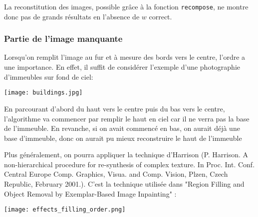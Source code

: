 \documentclass[a4paper, 10pt]{article}
\begin{document}
La reconstitution des images, possible grâce à la fonction \texttt{recompose}, ne montre donc pas de grands résultats en l'absence de $w$ correct.

\subsubsection*{Partie de l'image manquante}

Lorsqu'on remplit l'image au fur et à mesure des bords vers le centre, l'ordre a une importance. En effet, il suffit de considérer l'exemple d'une photographie d'immeubles sur fond de ciel:

\begin{centering}
\texttt{[image: buildings.jpg]}
\end{centering}

En parcourant d'abord du haut vers le centre puis du bas vers le centre, l'algorithme va commencer par remplir le haut en ciel car il ne verra pas la base de l'immeuble. En revanche, si on avait commencé en bas, on aurait déjà une base d'immeuble, donc on aurait pu mieux reconstruire le haut de l'immeuble

Plus généralement, on pourra appliquer la technique d'Harrison (P. Harrison. A non-hierarchical procedure for re-synthesis of complex
texture. In Proc. Int. Conf. Central Europe Comp. Graphics, Visua. and
Comp. Vision, Plzen, Czech Republic, February 2001.). C'est la technique utilisée dans "Region Filling and Object Removal by Exemplar-Based Image
Inpainting" : 

\begin{centering}
\texttt{[image: effects\_filling\_order.png]}
\end{centering}
\end{document}
